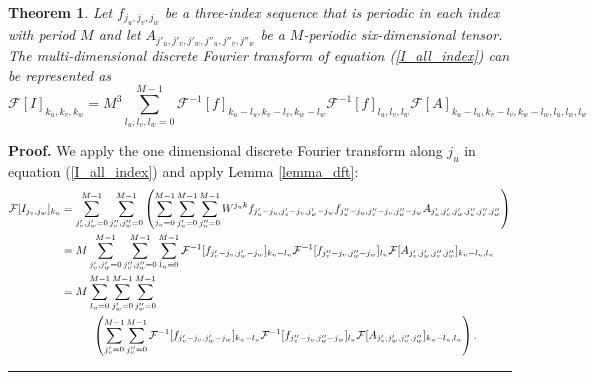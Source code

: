 \documentclass[12pt]{CSUNthesis}
\newtheorem{theorem}{Theorem}
\newenvironment{proof}[1][Proof]{\noindent\textbf{#1.} }{\newline \hspace*{\textwidth}\hspace*{-0,4cm} \rule{0.5em}{0.5em} \vspace{0,2cm}}
\def\calF{\mathcal{F}}
\begin{document}
\begin{theorem}
\label{thm3.1}
Let $f_{j_{u},j_{v},j_{w}}$ be a three-index sequence that is periodic in each index with period $M$ and let $A_{j'_{u},j'_{v},j'_{w},j''_{u},j''_{v},j''_{w}}$ be a $M$-periodic six-dimensional tensor. The multi-dimensional discrete Fourier transform of equation (\ref{I_all_index}) can be represented as
\begin{equation}
\label{FI_formula}
\calF [I]_{k_{u},k_{v},k_{w}} = M^3 \sum_{l_{u},l_{v},l_{w}=0}^{M-1} \calF^{-1}[f]_{k_{u}-l_{u},k_{v}-l_{v},k_{w}-l_{w}} \calF^{-1}[f]_{l_{u},l_{v},l_{w}} \calF[A]_{k_{u}-l_{u},k_{v}-l_{v},k_{w}-l_{w},l_{u},l_{w},l_{w}}
\end{equation}
\end{theorem}

\begin{proof}
We apply the one dimensional discrete Fourier transform along $j_u$ in equation (\ref{I_all_index}) and apply Lemma {\ref{lemma_dft}}:
\begin{align}
\label{lemma_once}
\calF[I_{j_v,j_w}]_{k_{u}}&= \sum_{j_v',j_w'=0}^{M-1} \sum_{j_v'',j_w''=0}^{M-1} \left(\sum_{j_u=0}^{M-1} \sum_{j_u'=0}^{M-1} \sum_{j_u''=0}^{M-1} W^{j_u k} f_{j_u'-j_u,j_v'-j_v,j_w'-j_w} f_{j_u''-j_u,j_v''-j_v,j_w''-j_w} A_{j'_{u},j'_{v},j'_{w},j''_u,j''_{v},j''_{w}}\right) \nonumber \\ 
&= M\sum_{j_v',j_w'=0}^{M-1} \sum_{j_v'',j_w''=0}^{M-1} \sum_{l_{u}=0}^{M-1} \calF^{-1}[f_{j_v'-j_v,j_w'-j_w}]_{k_{u}-l_{u}} \calF^{-1}[f_{j_v''-j_v,j_w''-j_w}]_{l_u} \calF[A_{j'_{v},j'_{w},j''_{v},j''_{w}}]_{k_{u}-l_{u},l_{u}} \nonumber \\ 
&= M\sum_{l_u=0}^{M-1} \sum_{j_w'=0}^{M-1} \sum_{j_w''=0}^{M-1} \nonumber \\
& \hspace{10mm} 
\left( \sum_{j_v'=0}^{M-1} \sum_{j_v''=0}^{M-1}   \calF^{-1}[f_{j_v'-j_v,j_w'-j_w}]_{k_{u}-l_{u}} \calF^{-1}[f_{j_v''-j_v,j_w''-j_w}]_{l_{u}} \calF[A_{j'_{v},j'_{w},j''_{v},j''_{w}}]_{k_{u}-l_{u},l_{u}} \right) .
\end{align}


\end{proof}
\end{document}
